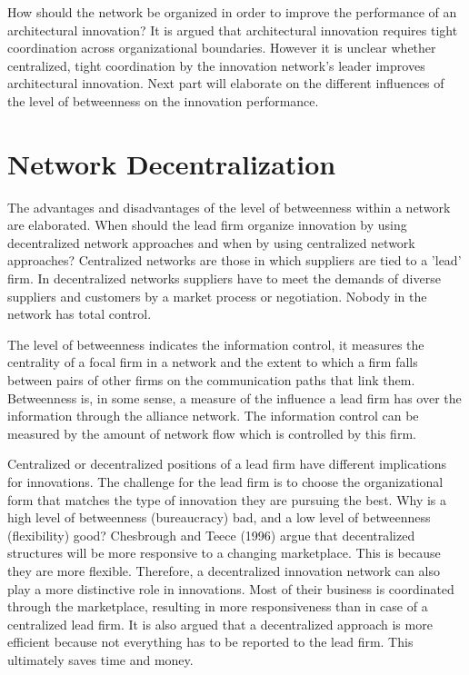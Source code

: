 How should the network be organized in order to improve the performance of an architectural innovation? It is argued that architectural innovation requires tight coordination across organizational boundaries. However it is unclear whether centralized, tight coordination by the innovation network’s leader improves architectural innovation. Next part will elaborate on the different influences of the level of betweenness on the innovation performance.


\section{Network Decentralization}

The advantages and disadvantages of the level of betweenness within a network are elaborated. When should the lead firm organize innovation by using decentralized network approaches and when by using centralized network approaches? Centralized networks are those in which suppliers are tied to a ’lead’ firm. In decentralized networks suppliers have to meet the demands of diverse suppliers and customers by a market process or negotiation. Nobody in the network has total control.

The level of betweenness indicates the information control, it measures the centrality of a focal firm in a network and the extent to which a firm falls between pairs of other firms on the communication paths that link them. Betweenness is, in some sense, a measure of the influence a lead firm has over the information through the alliance network. The information control can be measured by the amount of network flow which is controlled by this firm.

Centralized or decentralized positions of a lead firm have different implications for innovations. The challenge for the lead firm is to choose the organizational form that matches the type of innovation they are pursuing the best. Why is a high level of betweenness (bureaucracy) bad, and a low level of betweenness (flexibility) good? Chesbrough and Teece (1996) argue that decentralized structures will be more responsive to a changing marketplace. This is because they are more flexible. Therefore, a decentralized innovation network can also play a more distinctive role in innovations. Most of their business is coordinated through the marketplace, resulting in more responsiveness than in case of a centralized lead firm. It is also argued that a decentralized approach is more efficient because not everything has to be reported to the lead firm. This ultimately saves time and money.
